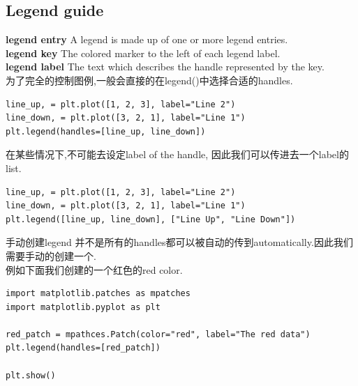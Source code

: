 \subsection{Legend guide}
\textbf{legend entry} A legend is made up of one or more legend entries.\\
\textbf{legend key} The colored marker to the left of each legend label.\\
\textbf{legend label} The text which describes the handle represented by the key.\\
为了完全的控制图例,一般会直接的在legend()中选择合适的handles.\\
\begin{lstlisting}
line_up, = plt.plot([1, 2, 3], label="Line 2")
line_down, = plt.plot([3, 2, 1], label="Line 1")
plt.legend(handles=[line_up, line_down])
\end{lstlisting}

\noindent{}在某些情况下,不可能去设定label of the handle, 因此我们可以传进去一个label的list.\\
\begin{lstlisting}
line_up, = plt.plot([1, 2, 3], label="Line 2")
line_down, = plt.plot([3, 2, 1], label="Line 1")
plt.legend([line_up, line_down], ["Line Up", "Line Down"])
\end{lstlisting}

\noindent{}手动创建legend
并不是所有的handles都可以被自动的传到automatically.因此我们需要手动的创建一个.\\
例如下面我们创建的一个红色的red color.\\
\begin{lstlisting}
import matplotlib.patches as mpatches
import matplotlib.pyplot as plt

red_patch = mpathces.Patch(color="red", label="The red data")
plt.legend(handles=[red_patch])

plt.show()
\end{lstlisting}




